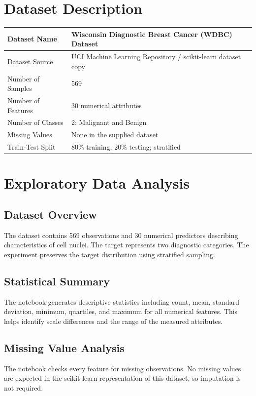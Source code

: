 \documentclass[12pt,a4paper]{article}
\begin{document}
\section{Dataset Description}
\begin{longtable}{|p{6cm}|p{8cm}|}
\hline
Dataset Name & Wisconsin Diagnostic Breast Cancer (WDBC) Dataset \\ \hline
Dataset Source & UCI Machine Learning Repository / scikit-learn dataset copy \\ \hline
Number of Samples & 569 \\ \hline
Number of Features & 30 numerical attributes \\ \hline
Number of Classes & 2: Malignant and Benign \\ \hline
Missing Values & None in the supplied dataset \\ \hline
Train-Test Split & 80\% training, 20\% testing; stratified \\ \hline
\end{longtable}

\section{Exploratory Data Analysis}

\subsection{Dataset Overview}
The dataset contains 569 observations and 30 numerical predictors describing characteristics of cell nuclei. The target represents two diagnostic categories. The experiment preserves the target distribution using stratified sampling.

\subsection{Statistical Summary}
The notebook generates descriptive statistics including count, mean, standard deviation, minimum, quartiles, and maximum for all numerical features. This helps identify scale differences and the range of the measured attributes.

\subsection{Missing Value Analysis}
The notebook checks every feature for missing observations. No missing values are expected in the scikit-learn representation of this dataset, so imputation is not required.
\end{document}
